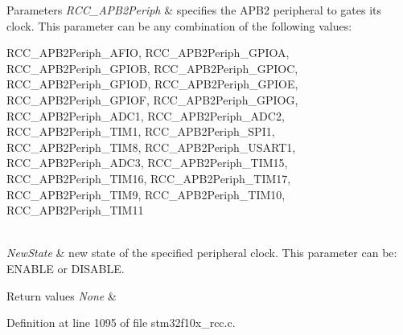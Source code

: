 \begin{DoxyParams}{Parameters}
{\em R\+C\+C\+\_\+\+A\+P\+B2\+Periph} & specifies the A\+P\+B2 peripheral to gates its clock. This parameter can be any combination of the following values\+: \begin{DoxyItemize}
\item R\+C\+C\+\_\+\+A\+P\+B2\+Periph\+\_\+\+A\+F\+IO, R\+C\+C\+\_\+\+A\+P\+B2\+Periph\+\_\+\+G\+P\+I\+OA, R\+C\+C\+\_\+\+A\+P\+B2\+Periph\+\_\+\+G\+P\+I\+OB, R\+C\+C\+\_\+\+A\+P\+B2\+Periph\+\_\+\+G\+P\+I\+OC, R\+C\+C\+\_\+\+A\+P\+B2\+Periph\+\_\+\+G\+P\+I\+OD, R\+C\+C\+\_\+\+A\+P\+B2\+Periph\+\_\+\+G\+P\+I\+OE, R\+C\+C\+\_\+\+A\+P\+B2\+Periph\+\_\+\+G\+P\+I\+OF, R\+C\+C\+\_\+\+A\+P\+B2\+Periph\+\_\+\+G\+P\+I\+OG, R\+C\+C\+\_\+\+A\+P\+B2\+Periph\+\_\+\+A\+D\+C1, R\+C\+C\+\_\+\+A\+P\+B2\+Periph\+\_\+\+A\+D\+C2, R\+C\+C\+\_\+\+A\+P\+B2\+Periph\+\_\+\+T\+I\+M1, R\+C\+C\+\_\+\+A\+P\+B2\+Periph\+\_\+\+S\+P\+I1, R\+C\+C\+\_\+\+A\+P\+B2\+Periph\+\_\+\+T\+I\+M8, R\+C\+C\+\_\+\+A\+P\+B2\+Periph\+\_\+\+U\+S\+A\+R\+T1, R\+C\+C\+\_\+\+A\+P\+B2\+Periph\+\_\+\+A\+D\+C3, R\+C\+C\+\_\+\+A\+P\+B2\+Periph\+\_\+\+T\+I\+M15, R\+C\+C\+\_\+\+A\+P\+B2\+Periph\+\_\+\+T\+I\+M16, R\+C\+C\+\_\+\+A\+P\+B2\+Periph\+\_\+\+T\+I\+M17, R\+C\+C\+\_\+\+A\+P\+B2\+Periph\+\_\+\+T\+I\+M9, R\+C\+C\+\_\+\+A\+P\+B2\+Periph\+\_\+\+T\+I\+M10, R\+C\+C\+\_\+\+A\+P\+B2\+Periph\+\_\+\+T\+I\+M11 \end{DoxyItemize}
\\
\hline
{\em New\+State} & new state of the specified peripheral clock. This parameter can be\+: E\+N\+A\+B\+LE or D\+I\+S\+A\+B\+LE. \\
\hline
\end{DoxyParams}

\begin{DoxyRetVals}{Return values}
{\em None} & \\
\hline
\end{DoxyRetVals}


Definition at line 1095 of file stm32f10x\+\_\+rcc.\+c.

